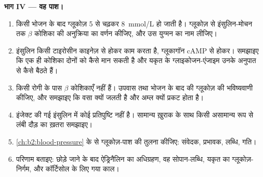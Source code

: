 \begin{problem}
\medskip
\noindent\textbf{भाग IV --- वह पाश।}
\begin{enumerate}[resume]
  \item किसी भोजन के बाद ग्लूकोज़ 5 से चढ़कर \qty{8}{mmol/L} हो जाती है।
        ग्लूकोज़ से इंसुलिन-मोचन तक $\beta$ कोशिका की अनुक्रिया का
        वर्णन कीजिए, और उस युग्मन का नाम लीजिए।
  \item इंसुलिन किसी टाइरोसीन काइनेज़ से होकर काम करता है, ग्लूकागॉन
        cAMP से होकर। समझाइए कि एक ही कोशिका दोनों को कैसे मान सकती है और
        यकृत के ग्लाइकोजन-एंजाइम उनके अनुपात से कैसे बैठते हैं।
  \item किसी रोगी के पास $\beta$ कोशिकाएँ नहीं हैं। उपवास तथा
        भोजन के बाद की ग्लूकोज़ की भविष्यवाणी कीजिए, और समझाइए कि वसा क्यों जलती है और अम्ल
        क्यों प्रकट होता है।
  \item इंजेक्ट की गई इंसुलिन में कोई प्रतिपुष्टि नहीं है। सामान्य ख़ुराक के साथ
        किसी असामान्य रूप से लंबी दौड़ का ख़तरा समझाइए।
  \item \cref{ch:b2:blood-pressure} के  से
        ग्लूकोज़-पाश की तुलना कीजिए: संवेदक, प्रभावक, लब्धि, गति।
  \item परिणाम बताइए: छोड़े जाने के बाद ऐड्रिनैलिन का अधिग्रहण, वह
        सोपान-लब्धि, यकृत का ग्लूकोज़-निर्गम, और कॉर्टिसोल के लिए गया
        काल।
\end{enumerate}
\end{problem}

